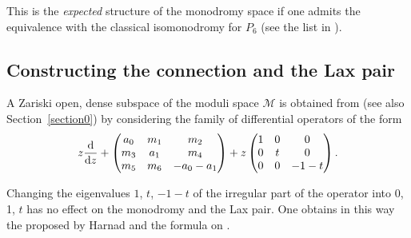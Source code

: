 \documentclass[pdftex]{sigma}
\numberwithin{equation}{section}
\begin{document}
 This is the {\it expected} structure of the monodromy space if one admits the equivalence with the classical
 isomonodromy for $P_6$ (see the list in \cite[Section~2.2]{vdP-Sa}).

\subsection{Constructing the connection and the Lax pair}

 A Zariski open, dense subspace of the moduli space $\mathcal{M}$ is obtained from \cite[Theorem 12.4]{vdP-Si} (see also Section~\ref{section0}) by considering the family of differential operators of the form
 \[ z\frac{{\rm d}}{{\rm d}z}+\begin{pmatrix}a_0 &m_1 &m_2 \\m_3 &a_1 &m_4 \\ m_5 &m_6 &-a_0-a_1 \end{pmatrix}
 +z\begin{pmatrix}1 &0 &0 \\ 0& t& 0\\ 0& 0&-1-t \end{pmatrix}.\]

Changing the eigenvalues $1$, $t$, $-1-t$ of the irregular part of the operator into 0, 1, $t$ has no effect on the
monodromy and the Lax pair. One obtains in this way the \cite[formula (3.62)]{H} proposed by Harnad and the formula on \cite[p.\ 3]{Maz}.
\end{document}
